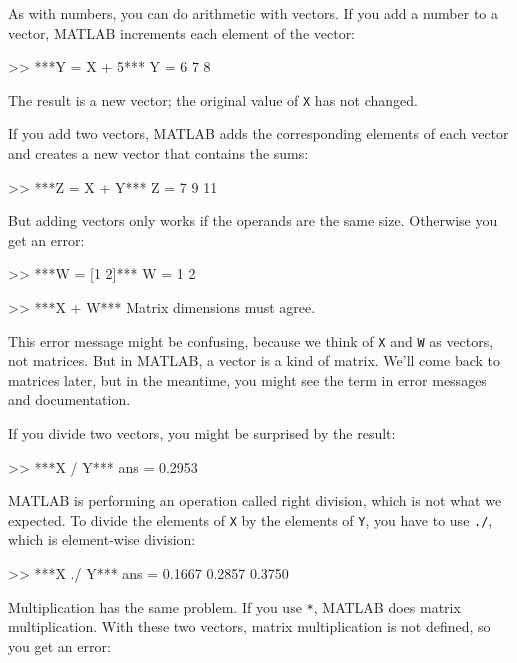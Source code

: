 As with numbers, you can do arithmetic with vectors.  If you add a number
to a vector, MATLAB increments each element of the vector:

\begin{code}
>> ***Y = X + 5***
Y = 6     7     8
\end{code}

The result is a new vector; the original value of \lstinline{X} has not
changed.

If you add two vectors, MATLAB adds the corresponding elements of each
vector and creates a new vector that contains the sums:

\begin{code}
>> ***Z = X + Y***
Z = 7     9    11
\end{code}

But adding vectors only works if the operands are the same size.
Otherwise you get an error:

\begin{code}
>> ***W = [1 2]***
W = 1     2     

>> ***X + W***
Matrix dimensions must agree.
\end{code}

This error message might be confusing, because we think of \lstinline{X} and \lstinline{W} as vectors, not matrices.
But in MATLAB, a vector is a kind of matrix.
We'll come back to matrices later, but in the meantime, you might see the term in error messages and documentation.


If you divide two vectors, you might be surprised by the result:

\begin{code}
>> ***X / Y***
ans = 0.2953
\end{code}

MATLAB is performing an operation called right division, which is not what we expected. 
To divide the elements of \lstinline{X} by the elements of \lstinline{Y}, you have to use \lstinline{./}, which is element-wise division:

\begin{code}
>> ***X ./ Y***
ans = 0.1667    0.2857    0.3750
\end{code}

Multiplication has the same problem.  If you use \lstinline{*}, MATLAB does matrix multiplication.  With these two vectors, matrix multiplication is not defined, so you get an error:

